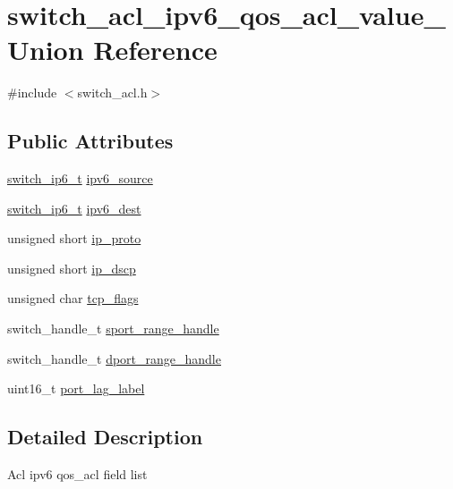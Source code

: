 \hypertarget{unionswitch__acl__ipv6__qos__acl__value__}{\section{switch\+\_\+acl\+\_\+ipv6\+\_\+qos\+\_\+acl\+\_\+value\+\_\+ Union Reference}
\label{unionswitch__acl__ipv6__qos__acl__value__}
}


{\ttfamily \#include $<$switch\+\_\+acl.\+h$>$}

\subsection*{Public Attributes}
\begin{DoxyCompactItemize}
\item 
\hyperlink{structswitch__uint128__t}{switch\+\_\+ip6\+\_\+t} \hyperlink{unionswitch__acl__ipv6__qos__acl__value___a8842920f9ad115d60f84044c944c9409}{ipv6\+\_\+source}
\item 
\hyperlink{structswitch__uint128__t}{switch\+\_\+ip6\+\_\+t} \hyperlink{unionswitch__acl__ipv6__qos__acl__value___a94dbab679a02201ca162e682329c1adc}{ipv6\+\_\+dest}
\item 
unsigned short \hyperlink{unionswitch__acl__ipv6__qos__acl__value___aadf1452ef7b5c9e68b7e7f3a6fb6f03e}{ip\+\_\+proto}
\item 
unsigned short \hyperlink{unionswitch__acl__ipv6__qos__acl__value___a28d3aa1c9fe459eb6094e0e5604cc2e0}{ip\+\_\+dscp}
\item 
unsigned char \hyperlink{unionswitch__acl__ipv6__qos__acl__value___aae3c76a4c682a337b27a043845760585}{tcp\+\_\+flags}
\item 
switch\+\_\+handle\+\_\+t \hyperlink{unionswitch__acl__ipv6__qos__acl__value___a6b6801f2ac43308b5d5f9a68491bd2f2}{sport\+\_\+range\+\_\+handle}
\item 
switch\+\_\+handle\+\_\+t \hyperlink{unionswitch__acl__ipv6__qos__acl__value___ae013f6add0c07e454656355841f8a23e}{dport\+\_\+range\+\_\+handle}
\item 
uint16\+\_\+t \hyperlink{unionswitch__acl__ipv6__qos__acl__value___a2e038678201f541f04b51236f7253d94}{port\+\_\+lag\+\_\+label}
\end{DoxyCompactItemize}


\subsection{Detailed Description}
Acl ipv6 qos\+\_\+acl field list 

